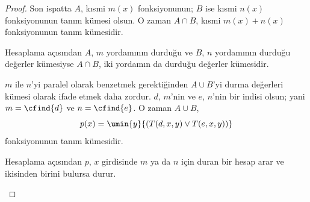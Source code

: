 \documentclass[../../../include/open-logic-section]{subfiles}
\begin{document}
\begin{proof}
Son ispatta $A$, kısmi $m(x)$ fonksiyonunun; $B$ ise kısmi $n(x)$
fonksiyonunun tanım kümesi olsun. O zaman $A\cap B$, kısmi
$m(x)+n(x)$ fonksiyonunun tanım kümesidir.

\begin{explain}
Hesaplama açısından $A$, $m$ yordamının durduğu ve $B$, $n$ yordamının
durduğu değerler kümesiyse $A\cap B$, iki yordamın da durduğu değerler
kümesidir.
\end{explain}

$m$ ile $n$'yi paralel olarak benzetmek gerektiğinden $A\cup B$'yi durma
değerleri kümesi olarak ifade etmek daha zordur. $d$, $m$'nin ve $e$,
$n$'nin bir indisi olsun; yani $m=\cfind{d}$ ve $n=\cfind{e}$. O zaman
$A\cup B$,
\[
  p(x)=\umin{y}{(T(d,x,y)\lor T(e,x,y))}
\]
fonksiyonunun tanım kümesidir.
\begin{explain}
Hesaplama açısından $p$, $x$ girdisinde $m$ ya da $n$ için duran bir hesap
arar ve ikisinden birini bulursa durur.
\end{explain}
\end{proof}
\end{document}
